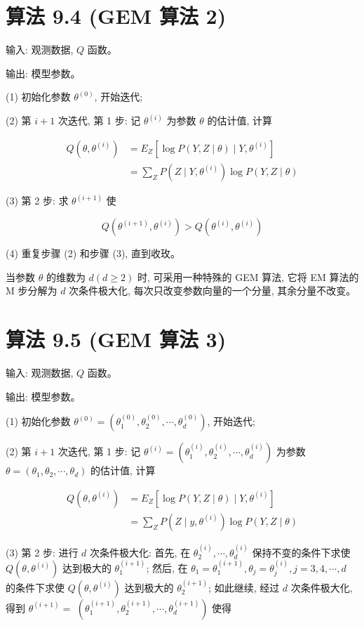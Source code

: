 \documentclass[10pt]{article}
\begin{document}
\section*{算法 9.4 (GEM 算法 2)}
输入: 观测数据, $Q$ 函数。

输出: 模型参数。

(1) 初始化参数 $\theta^{(0)}$, 开始迭代;

(2) 第 $i+1$ 次迭代, 第 1 步: 记 $\theta^{(i)}$ 为参数 $\theta$ 的估计值, 计算

$$
\begin{aligned}
Q\left(\theta, \theta^{(i)}\right) & =E_{Z}\left[\log P(Y, Z \mid \theta) \mid Y, \theta^{(i)}\right] \\
& =\sum_{Z} P\left(Z \mid Y, \theta^{(i)}\right) \log P(Y, Z \mid \theta)
\end{aligned}
$$

(3) 第 2 步: 求 $\theta^{(i+1)}$ 使

$$
Q\left(\theta^{(i+1)}, \theta^{(i)}\right)>Q\left(\theta^{(i)}, \theta^{(i)}\right)
$$

(4) 重复步骤 (2) 和步骤 (3), 直到收玫。

当参数 $\theta$ 的维数为 $d(d \geqslant 2)$ 时, 可采用一种特殊的 GEM 算法, 它将 EM 算法的 M 步分解为 $d$ 次条件极大化, 每次只改变参数向量的一个分量, 其余分量不改变。

\section*{算法 9.5 (GEM 算法 3)}
输入: 观测数据, $Q$ 函数。

输出: 模型参数。

(1) 初始化参数 $\theta^{(0)}=\left(\theta_{1}^{(0)}, \theta_{2}^{(0)}, \cdots, \theta_{d}^{(0)}\right)$, 开始迭代;

(2) 第 $i+1$ 次迭代, 第 1 步: 记 $\theta^{(i)}=\left(\theta_{1}^{(i)}, \theta_{2}^{(i)}, \cdots, \theta_{d}^{(i)}\right)$ 为参数 $\theta=\left(\theta_{1}, \theta_{2}, \cdots, \theta_{d}\right)$ 的估计值, 计算

$$
\begin{aligned}
Q\left(\theta, \theta^{(i)}\right) & =E_{Z}\left[\log P(Y, Z \mid \theta) \mid Y, \theta^{(i)}\right] \\
& =\sum_{Z} P\left(Z \mid y, \theta^{(i)}\right) \log P(Y, Z \mid \theta)
\end{aligned}
$$

(3) 第 2 步: 进行 $d$ 次条件极大化: 首先, 在 $\theta_{2}^{(i)}, \cdots, \theta_{d}^{(i)}$ 保持不变的条件下求使 $Q\left(\theta, \theta^{(i)}\right)$ 达到极大的 $\theta_{1}^{(i+1)}$; 然后, 在 $\theta_{1}=\theta_{1}^{(i+1)}, \theta_{j}=\theta_{j}^{(i)}, j=3,4, \cdots, d$ 的条件下求使 $Q\left(\theta, \theta^{(i)}\right)$ 达到极大的 $\theta_{2}^{(i+1)}$; 如此继续, 经过 $d$ 次条件极大化, 得到 $\theta^{(i+1)}=$ $\left(\theta_{1}^{(i+1)}, \theta_{2}^{(i+1)}, \cdots, \theta_{d}^{(i+1)}\right)$ 使得
\end{document}
